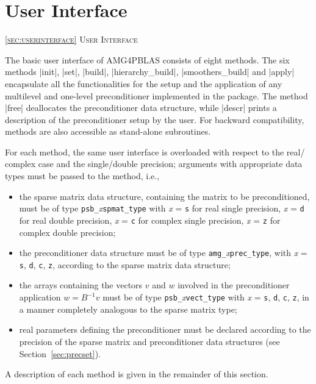 \section{User Interface\label{sec:userinterface}}
         {\textsc{\ref{sec:userinterface} User Interface}}

The basic user interface of AMG4PBLAS consists of eight methods. The six
methods \fortinline|init|, \fortinline|set|, \fortinline|build|,
\fortinline|hierarchy_build|, \fortinline|smoothers_build| and \fortinline|apply|
encapsulate all the functionalities for the setup and the application
of any multilevel and one-level preconditioner implemented in the
package.
The method \fortinline|free| deallocates the preconditioner data structure, while
\fortinline|descr| prints a description of the preconditioner setup by the user.
For backward compatibility,  methods are also accessible as
stand-alone subroutines.

For each method, the same user interface is overloaded with
respect to the real/ complex case and the single/double precision;
arguments with appropriate data types must be passed to the method,
i.e.,
\begin{itemize}
\item the sparse matrix data structure, containing the matrix to be
  preconditioned, must be of type \verb|psb_|\emph{x}\verb|spmat_type|
	with \emph{x} = \verb|s| for real single precision, \emph{x} = \verb|d|
	for real double precision, \emph{x} = \verb|c| for complex single precision,
	\emph{x} = \verb|z| for complex double precision;
\item the preconditioner data structure must be of type
  \verb|amg_|\emph{x}\verb|prec_type|, with \emph{x} =
  \verb|s|, \verb|d|, \verb|c|, \verb|z|, according to the sparse
  matrix data structure;
\item the arrays containing the vectors $v$ and $w$ involved in
  the preconditioner application $w=B^{-1}v$ must be of type
  \verb|psb_|\emph{x}\verb|vect_type| with \emph{x} =
  \verb|s|, \verb|d|, \verb|c|, \verb|z|, in a manner completely
  analogous to the sparse matrix type;
\item real parameters defining the preconditioner must be declared
  according to the precision of the sparse matrix and preconditioner
  data structures (see Section~\ref{sec:precset}).
\end{itemize}
A description of each method is given in the remainder of this section.

